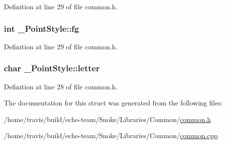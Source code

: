 Definition at line 29 of file common.\-h.

\hypertarget{struct___point_style_aad357bccd6e6759fc8575d3354d2bc7b}{
\subsubsection[{fg}]{\setlength{\rightskip}{0pt plus 5cm}int \-\_\-\-Point\-Style\-::fg}}\label{struct___point_style_aad357bccd6e6759fc8575d3354d2bc7b}


Definition at line 29 of file common.\-h.

\hypertarget{struct___point_style_aa4cf23b21f61b08b05ff90b37fb26bc8}{
\subsubsection[{letter}]{\setlength{\rightskip}{0pt plus 5cm}char \-\_\-\-Point\-Style\-::letter}}\label{struct___point_style_aa4cf23b21f61b08b05ff90b37fb26bc8}


Definition at line 28 of file common.\-h.



The documentation for this struct was generated from the following files\-:\begin{DoxyCompactItemize}
\item 
/home/travis/build/echo-\/team/\-Snoke/\-Libraries/\-Common/\hyperlink{common_8h}{common.\-h}\item 
/home/travis/build/echo-\/team/\-Snoke/\-Libraries/\-Common/\hyperlink{common_8cpp}{common.\-cpp}\end{DoxyCompactItemize}
